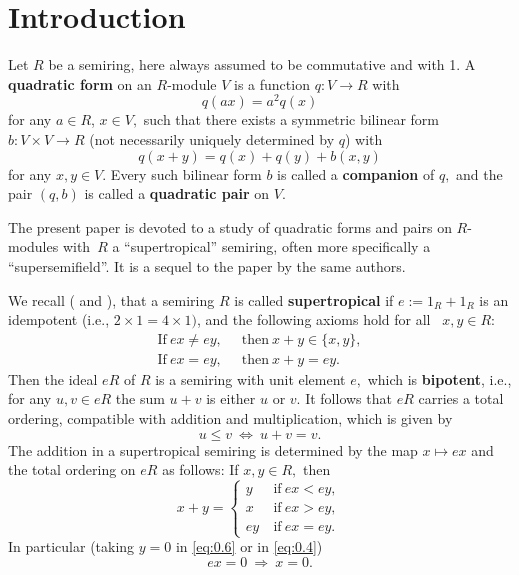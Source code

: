 \documentclass [12pt,a4paper,reqno]{amsart}
\begin{document}

\section*{Introduction}

Let $R$ be a semiring, here always assumed to be commutative and
with 1. A {\textbf{{quadratic form}}} on an $R$-module $V$ is a function
$q: V\to R$ with
\begin{equation}\label{eq:0.1}
q(ax)=a^2q(x)
\end{equation}
for any $a\in R$, $x\in V,$ such that there exists a symmetric
bilinear form $b:V\times V\to R$ (not necessarily uniquely
determined by $q$) with
\begin{equation}\label{eq:0.2}
q(x+y)= q(x)+q(y)+b(x,y)
\end{equation}
for any $x,y\in V.$ Every such bilinear form $b$ is called a
{\textbf{{companion}}} of $q,$ and the pair $(q,b)$ is called a
{\textbf{{quadratic pair}}} on $V.$

The present paper is devoted to a study of quadratic forms and
pairs on $R$-modules with~$R$ a ``supertropical'' semiring,
often more specifically a ``supersemifield''. It is a sequel to the paper
\cite{QF1} by the same authors.

We recall ({\cite[Definition~{{0.3}}]{QF1}} and \cite[\S3]{IKR1}), that a semiring $R$ is
called {\textbf{{supertropical}}} if $e:=1_R+1_R$ is an idempotent
(i.e., $2\times 1=4\times 1)$, and the following axioms hold for
all~ $x,y\in R:$
\begin{align}
\text{If}\ ex\ne ey, & \ \text{ then} \ x+y\in\{x,y\}, \label{eq:0.3} \\
\text{If}\ ex= ey,& \ \text{ then} \ x+y=ey. \label{eq:0.4}
\end{align}
Then the ideal $eR$ of $R$ is a semiring with unit element $e,$
which is {\textbf{{bipotent}}}, i.e., for any $u,v\in eR$ the sum $u+v$
is either $u$ or $v.$ It follows that $eR$ carries a total
ordering, compatible with addition and multiplication, which is
given by
\begin{equation}\label{eq:0.5}
u\le v {\ {\Leftrightarrow} \ } u+v=v.
\end{equation}
The addition in a supertropical semiring is determined by the map
$x\mapsto ex$ and the total ordering on $eR$ as follows: If
$x,y\in R,$ then
\begin{equation}\label{eq:0.6}
x+y=\begin{cases} y&\ \text{if}\ ex<ey,\\
x&\ \text{if}\ ex>ey,\\
ey&\ \text{if}\ ex=ey.
\end{cases}
\end{equation}
In particular (taking  $y=0$ in \eqref{eq:0.6} or in \eqref{eq:0.4})
\begin{equation}\label{eq:0.7}
ex=0 {\ {\Rightarrow} \ } x=0.
\end{equation}
\end{document}
